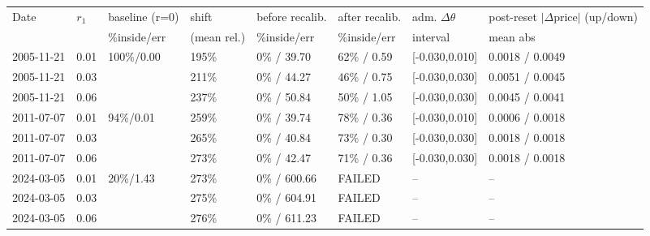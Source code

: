 \begin{tabular}{llllllll}
\toprule
Date & $r_1$ & baseline (r=0) & shift & before recalib. & after recalib. & adm. $\Delta\theta$ & post-reset $|\Delta$price$|$ (up/down) \\
& & \%inside/err & (mean rel.) & \%inside/err & \%inside/err & interval & mean abs \\
\midrule
2005-11-21 & 0.01 & 100\%/0.00 & 195\% & 0\% / 39.70 & 62\% / 0.59 & [-0.030,0.010] & 0.0018 / 0.0049 \\
2005-11-21 & 0.03 &  & 211\% & 0\% / 44.27 & 46\% / 0.75 & [-0.030,0.030] & 0.0051 / 0.0045 \\
2005-11-21 & 0.06 &  & 237\% & 0\% / 50.84 & 50\% / 1.05 & [-0.030,0.030] & 0.0045 / 0.0041 \\
2011-07-07 & 0.01 & 94\%/0.01 & 259\% & 0\% / 39.74 & 78\% / 0.36 & [-0.030,0.010] & 0.0006 / 0.0018 \\
2011-07-07 & 0.03 &  & 265\% & 0\% / 40.84 & 73\% / 0.30 & [-0.030,0.030] & 0.0018 / 0.0018 \\
2011-07-07 & 0.06 &  & 273\% & 0\% / 42.47 & 71\% / 0.36 & [-0.030,0.030] & 0.0018 / 0.0018 \\
2024-03-05 & 0.01 & 20\%/1.43 & 273\% & 0\% / 600.66 & FAILED & -- & -- \\
2024-03-05 & 0.03 &  & 275\% & 0\% / 604.91 & FAILED & -- & -- \\
2024-03-05 & 0.06 &  & 276\% & 0\% / 611.23 & FAILED & -- & -- \\
\bottomrule
\end{tabular}
